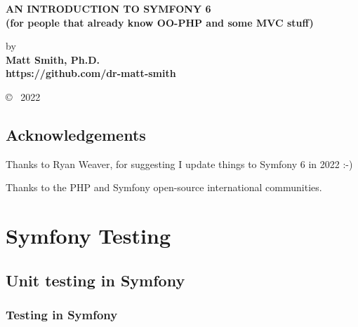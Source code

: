 \documentclass[a4paperpaper,openright]{book}
\date{}
\begin{document}
\begin{titlepage}
    \begin{center}
    
        \vspace*{1cm}
        

       \large{ \textbf{ \uppercase{An Introduction to Symfony 6}\\(for people that already know OO-PHP and some MVC stuff)}}
        
        \vspace{1.5cm}

        by\\
        \textbf{
        Matt Smith, Ph.D.\\https://github.com/dr-matt-smith
        }

       

        
        
        \vfill
  
            \copyright ~ 2022

     \end{center}
    \thispagestyle{empty}
\end{titlepage}

\newpage
\thispagestyle{empty}
\mbox{}

\frontmatter

\chapter{Acknowledgements}

Thanks to Ryan Weaver, for suggesting I update things to Symfony 6 in
2022 :-)

Thanks to the PHP and Symfony open-source international communities.

\tableofcontents

\mainmatter

\part{Symfony Testing}

\hypertarget{unit-testing-in-symfony}{%
\chapter{Unit testing in Symfony}\label{unit-testing-in-symfony}}

\hypertarget{testing-in-symfony}{%
\section{Testing in Symfony}\label{testing-in-symfony}}
\end{document}
